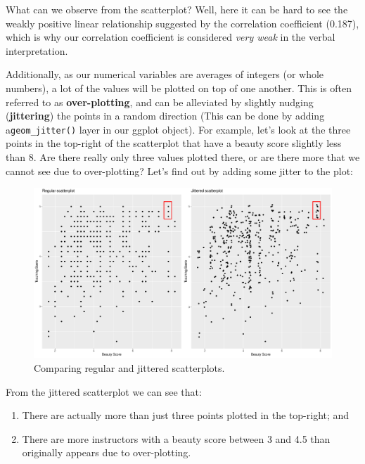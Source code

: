 \documentclass[
  letterpaper,
  DIV=11,
  numbers=noendperiod]{scrartcl}
\providecommand{\tightlist}{%
  \setlength{\itemsep}{0pt}\setlength{\parskip}{0pt}}\usepackage{longtable,booktabs,array}
\begin{document}
What can we observe from the scatterplot? Well, here it can be hard to
see the weakly positive linear relationship suggested by the correlation
coefficient (0.187), which is why our correlation coefficient is
considered \emph{very weak} in the verbal interpretation.

Additionally, as our numerical variables are averages of integers (or
whole numbers), a lot of the values will be plotted on top of one
another. This is often referred to as \textbf{over-plotting}, and can be
alleviated by slightly nudging (\textbf{jittering}) the points in a
random direction (This can be done by adding a\texttt{geom\_jitter()}
layer in our ggplot object). For example, let's look at the three points
in the top-right of the scatterplot that have a beauty score slightly
less than 8. Are there really only three values plotted there, or are
there more that we cannot see due to over-plotting? Let's find out by
adding some jitter to the plot:

\begin{figure}[H]

{\centering \includegraphics{index_files/figure-pdf/correlation5-1.pdf}

}

\caption{Comparing regular and jittered scatterplots.}

\end{figure}%

From the jittered scatterplot we can see that:

\begin{enumerate}
\def\labelenumi{\arabic{enumi}.}
\tightlist
\item
  There are actually more than just three points plotted in the
  top-right; and
\item
  There are more instructors with a beauty score between 3 and 4.5 than
  originally appears due to over-plotting.
\end{enumerate}
\end{document}
